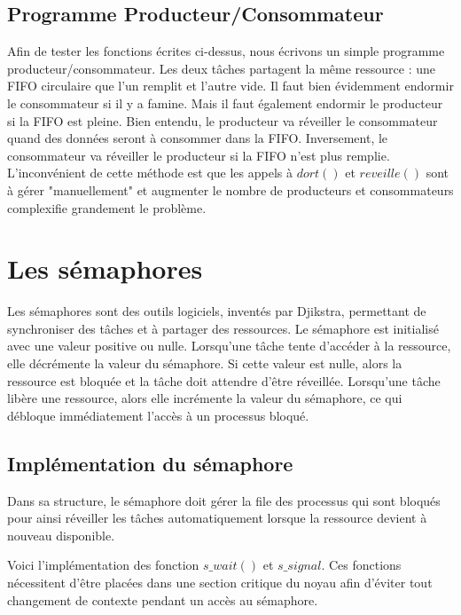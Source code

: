 \documentclass{article}
\begin{document}
\subsection{Programme Producteur/Consommateur}
Afin de tester les fonctions écrites ci-dessus, nous écrivons un simple programme producteur/consommateur. Les deux tâches partagent la même ressource : une FIFO circulaire que l'un remplit et l'autre vide.
Il faut bien évidemment endormir le consommateur si il y a famine. Mais il faut également endormir le producteur si la FIFO est pleine.
Bien entendu, le producteur va réveiller le consommateur quand des données seront à consommer dans la FIFO. Inversement, le consommateur va réveiller le producteur si la FIFO n'est plus remplie.
L'inconvénient de cette méthode est que les appels à $dort()$ et $reveille()$ sont à gérer "manuellement" et augmenter le nombre de producteurs et consommateurs complexifie grandement le problème.

\section{Les sémaphores}
Les sémaphores sont des outils logiciels, inventés par Djikstra, permettant de synchroniser des tâches et à partager des ressources. Le sémaphore est initialisé avec une valeur positive ou nulle. Lorsqu'une tâche tente d'accéder à la ressource, elle décrémente la valeur du sémaphore. Si cette valeur est nulle, alors la ressource est bloquée et la tâche doit attendre d'être réveillée.
Lorsqu'une tâche libère une ressource, alors elle incrémente la valeur du sémaphore, ce qui débloque immédiatement l'accès à un processus bloqué.

\subsection{Implémentation du sémaphore}
Dans sa structure, le sémaphore doit gérer la file des processus qui sont bloqués pour ainsi réveiller les tâches automatiquement lorsque la ressource devient à nouveau disponible.


Voici l'implémentation des fonction $s\_wait()$ et $s\_signal$. Ces fonctions nécessitent d'être placées dans une section critique du noyau afin d'éviter tout changement de contexte pendant un accès au sémaphore.

\end{document}
